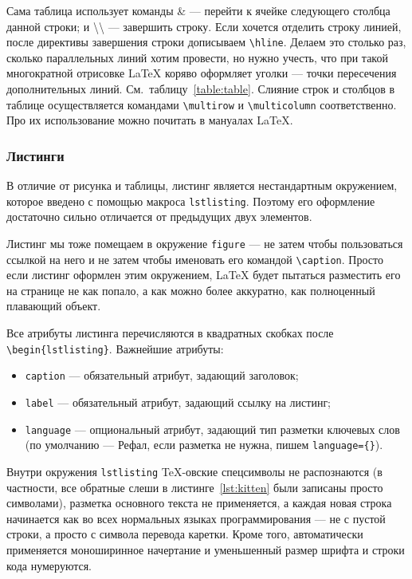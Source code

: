 \documentclass[14pt,russian]{scrartcl}
\begin{document}
Сама таблица использует команды \&{} --- перейти к ячейке следующего столбца данной строки; и \textbackslash\textbackslash{} --- завершить строку. Если хочется отделить строку линией, после директивы завершения строки дописываем \texttt{\textbackslash hline}. Делаем это столько раз, сколько параллельных линий хотим провести, но нужно учесть, что при такой многократной отрисовке \LaTeX{} коряво оформляет уголки --- точки пересечения дополнительных линий. См.~таблицу~\ref{table:table}. Слияние строк и столбцов в таблице осуществляется командами \texttt{\textbackslash multirow} и \texttt{\textbackslash multicolumn} соответственно. Про их использование можно почитать в мануалах \LaTeX.

\subsubsection{Листинги}

В отличие от рисунка и таблицы, листинг является нестандартным окружением, которое введено с помощью макроса \texttt{lstlisting}. Поэтому его оформление достаточно сильно отличается от предыдущих двух элементов.

Листинг мы тоже помещаем в окружение \texttt{figure} --- не затем чтобы пользоваться ссылкой на него и не затем чтобы именовать его командой \texttt{\textbackslash caption}. Просто если листинг оформлен этим окружением, \LaTeX{} будет пытаться разместить его на странице не как попало, а как можно более аккуратно, как полноценный плавающий объект.

Все атрибуты листинга перечисляются в квадратных скобках после \texttt{\textbackslash begin\{lstlisting\}}. Важнейшие атрибуты:
\begin{itemize}
\item \texttt{caption} --- обязательный атрибут, задающий заголовок;
\item \texttt{label} --- обязательный атрибут, задающий ссылку на листинг;
\item \texttt{language} --- опциональный атрибут, задающий тип разметки ключевых слов (по умолчанию --- Рефал, если разметка не нужна, пишем \texttt{language=\{\}}).
\end{itemize}

Внутри окружения \texttt{lstlisting} \TeX-овские спецсимволы не распознаются (в частности, все обратные слеши в листинге~\ref{lst:kitten} были записаны просто символами), разметка основного текста не применяется, а каждая новая строка начинается как во всех нормальных языках программирования --- не с пустой строки, а просто с символа перевода каретки. Кроме того, автоматически применяется моноширинное начертание и уменьшенный размер шрифта и строки кода нумеруются.
\end{document}

